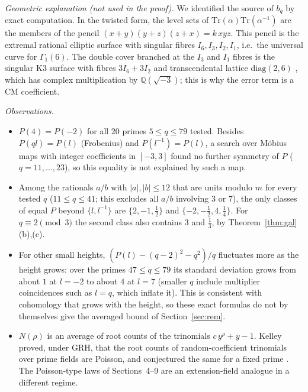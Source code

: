 \documentclass[11pt]{article}
\begin{document}
\emph{Geometric explanation (not used in the proof).} We identified the source of $b_q$ by exact computation. In the twisted form, the level sets of $\mathrm{Tr}(\alpha)\mathrm{Tr}(\alpha^{-1})$ are the members of the pencil
$(x+y)(y+z)(z+x)=k\,xyz$. This pencil is the extremal rational elliptic surface with singular fibres $I_6,I_3,I_2,I_1$, i.e.\ the universal curve for $\Gamma_1(6)$.
The double cover branched at the $I_3$ and $I_1$ fibres is the singular K3 surface with fibres $3I_6+3I_2$ and transcendental lattice $\mathrm{diag}(2,6)$ \cite{HS},
which has complex multiplication by $\mathbb Q(\sqrt{-3})$; this is why the error term is a CM coefficient.

\emph{Observations.}
\begin{itemize}
\item $P(4)=P(-2)$ for all 20 primes $5\le q\le79$ tested. Besides $P(ql)=P(l)$ (Frobenius) and $P(l^{-1})=P(l)$, a search over M\"obius maps with integer coefficients in $[-3,3]$ found no further symmetry of $P$ ($q=11,\dots,23$), so this equality is not explained by such a map.
\item Among the rationals $a/b$ with $|a|,|b|\le12$ that are units modulo $m$ for every tested $q$ ($11\le q\le41$; this excludes all $a/b$ involving $3$ or $7$), the only classes of equal $P$ beyond $\{l,l^{-1}\}$ are $\{2,-1,\tfrac12\}$ and $\{-2,-\tfrac12,4,\tfrac14\}$. For $q\equiv2\pmod3$ the second class also contains $3$ and $\tfrac13$, by Theorem~\ref{thm:gal}(b),(c).
\item For other small heights, $(P(l)-(q-2)^2-q^2)/q$ fluctuates more as the height grows: over the primes $47\le q\le79$ its standard deviation grows from about $1$ at $l=-2$ to about $4$ at $l=7$ (smaller $q$ include multiplier coincidences such as $l=q$, which inflate it). This is consistent with cohomology that grows with the height, so these exact formulas do not by themselves give the averaged bound of Section~\ref{sec:rem}.
\item $N(\rho)$ is an average of root counts of the trinomials $c\,y^\rho+y-1$. Kelley proved, under GRH, that the root counts of random-coefficient trinomials over prime fields are Poisson, and conjectured the same for a fixed prime \cite{Ke,KO,BCR}. The Poisson-type laws of Sections~4--9 are an extension-field analogue in a different regime.
\end{itemize}
\end{document}
